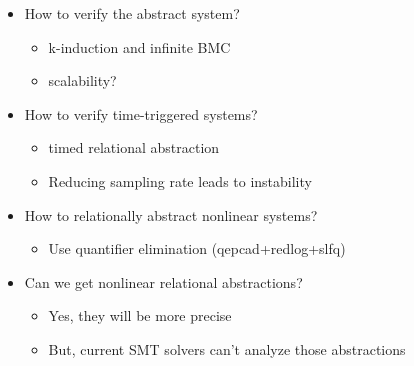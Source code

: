 \documentclass{seminar}
\begin{document}
\begin{slide}

\begin{itemize}
\item How to verify the abstract system?
 \begin{itemize}
  \item k-induction and infinite BMC
  \item scalability?
 \end{itemize}
\item How to verify time-triggered systems?
 \begin{itemize}
  \item timed relational abstraction
  \item Reducing sampling rate leads to instability
 \end{itemize}
\item How to relationally abstract nonlinear systems?
 \begin{itemize}
  \item Use quantifier elimination (qepcad+redlog+slfq)
 \end{itemize}
\item Can we get nonlinear relational abstractions?
 \begin{itemize}
  \item Yes, they will be more precise
  \item But, current SMT solvers can't analyze those abstractions
 \end{itemize}
 
\end{itemize}

\end{slide}
\end{document}
